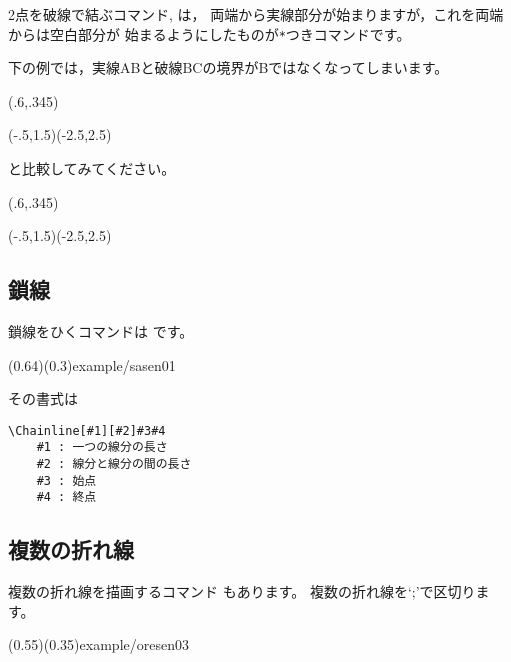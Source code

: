 \subsubsection{\texorpdfstring{}{Hasen*}}
2点を破線で結ぶコマンド, は，
両端から実線部分が始まりますが，これを両端からは空白部分が
始まるようにしたものが\verb+*+つきコマンドです。

下の例では，実線ABと破線BCの境界がBではなくなってしまいます。

\begin{showEx}(.6,.345){}
\begin{zahyou}[ul=10mm](-.5,1.5)(-2.5,2.5)
\kuromaru{\A;\B;\C;\D}
\Drawlines{\A\B;\C\D}
\Hasen{\B\C}
\end{zahyou}
\end{showEx}

と比較してみてください。
\begin{showEx}(.6,.345){}
\begin{zahyou}[ul=10mm](-.5,1.5)(-2.5,2.5)
\kuromaru{\A;\B;\C;\D}
\Drawlines{\A\B;\C\D}
\Hasen*{\B\C}
\end{zahyou}
\end{showEx}


\subsection{鎖線}
鎖線をひくコマンドは です。

{
(0.64)(0.3){example/sasen01}}

その書式は
\begin{boxnote}
\begin{verbatim}
\Chainline[#1][#2]#3#4
    #1 : 一つの線分の長さ
    #2 : 線分と線分の間の長さ
    #3 : 始点
    #4 : 終点
\end{verbatim}
\end{boxnote}

\subsection{複数の折れ線}
複数の折れ線を描画するコマンド  もあります。
複数の折れ線を`;'で区切ります。

(0.55)(0.35){example/oresen03}

